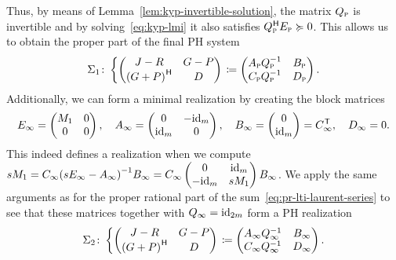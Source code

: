 Thus, by means of Lemma~\ref{lem:kyp-invertible-solution}, the matrix $Q_\msc{p}$ is invertible and by solving~\eqref{eq:kyp-lmi} it also satisfies $Q_\msc{p}\herm E_\msc{p} \succcurlyeq 0$.
This allows us to obtain the proper part of the final \ac{PH} system
\begin{equation}\label{eq:pr-proper-ph-part}
    \Sigma_1 \colon \left\lbrace
    \begin{pmatrix}
        J - R & G - P \\
        {(G + P)}\herm & D
    \end{pmatrix}
    \right. \coloneqq \begin{pmatrix}
        A_\msc{p} Q_\msc{p}\inv & B_\msc{p} \\
        C_\msc{p} Q_\msc{p}\inv & D_\msc{p}
    \end{pmatrix}.
\end{equation}
Additionally, we can form a minimal realization by creating the block matrices
\begin{equation*}
    E_\infty = \begin{pmatrix}
        M_1 & 0 \\
        0 & 0
    \end{pmatrix},\quad A_\infty = \begin{pmatrix}
        0 & -\id[m] \\
        \id[m] & 0
    \end{pmatrix},\quad B_\infty = \begin{pmatrix}
        0 \\
        \id[m]
    \end{pmatrix} = C_\infty\trans,\quad D_\infty = 0.
\end{equation*}
This indeed defines a realization when we compute $s M_1 = C_\infty {(s E_\infty - A_\infty)}\inv B_\infty = C_\infty \begin{pmatrix}
    0 & \id[m] \\
    -\id[m] & s M_1
\end{pmatrix} B_\infty$.
We apply the same arguments as for the proper rational part of the sum~\eqref{eq:pr-lti-laurent-series} to see that these matrices together with $Q_\infty = \id[2m]$ form a \ac{PH} realization
\begin{equation}\label{eq:pr-improper-ph-part}
    \Sigma_2 \colon \left\lbrace
    \begin{pmatrix}
        J - R & G - P \\
        {(G + P)}\herm & D
    \end{pmatrix}
    \right. \coloneqq \begin{pmatrix}
        A_\infty Q_\infty\inv & B_\infty \\
        C_\infty Q_\infty\inv & D_\infty
    \end{pmatrix}.
\end{equation}
